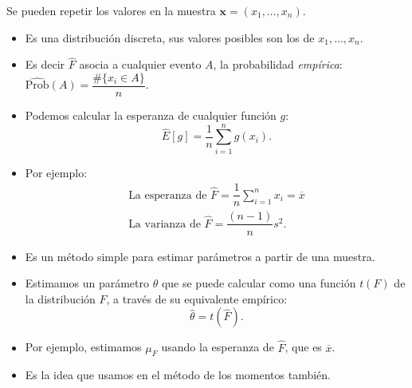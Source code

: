 \begin{tcolorbox}[colback=red!5!white, colframe=red!75!black, title=\textbf{Tened en cuenta}]
Se pueden repetir los valores en la muestra $\mathbf{x}=(x_1,\dots,x_n)$.
\end{tcolorbox}
\begin{tcolorbox}[colback=blue!5!white, colframe=blue!75!black, title=\textbf{La distribución empírica asociada a una muestra}]
\begin{itemize}[label=\textbullet]
    \item Es una distribución discreta, sus valores posibles son los de $x_1,\dots,x_n$.
    \item Es decir $\hat{F}$ asocia a cualquier evento $A$, la probabilidad \textit{empírica}: $\hat{\mathrm{Prob}}(A)=\dfrac{\#\{x_i\in A\} }{n}$.
    \item Podemos calcular la esperanza de cualquier función $g$:  \[
            \hat{E}[g]=\dfrac{1}{n}\sum_{i=1}^{n} g(x_i).
    \] 
\item Por ejemplo: \[
\begin{array}{c}
    \text{La esperanza de }\hat{F}=\dfrac{1}{n}\sum_{i=1}^{n} x_i=\overline{x}\\
    \text{La varianza de }\hat{F}=\dfrac{(n-1)}{n}s^2.
\end{array}
\] 
\end{itemize}
\end{tcolorbox}
\begin{tcolorbox}[colback=blue!5!white, colframe=blue!75!black, title=\textbf{El principio de plug-in:}]
\begin{itemize}[label=\textbullet]
    \item Es un método simple para estimar parámetros a partir de una muestra.
    \item Estimamos un parámetro $\theta$ que se puede calcular como una función $t(F)$ de la distribución  $F$, a través de su equivalente empírico: \[
    \hat{\theta}=t(\hat{F}).
    \] 
\end{itemize}
\end{tcolorbox}
\begin{tcolorbox}[colback=red!5!white, colframe=red!75!black, title=\textbf{Nota}]
\begin{itemize}[label=\textbullet]
    \item Por ejemplo, estimamos $\mu_F$ usando la esperanza de $\hat{F}$, que es $\overline{x}$.
    \item Es la idea que usamos en el método de los momentos también.
\end{itemize}
\end{tcolorbox}
